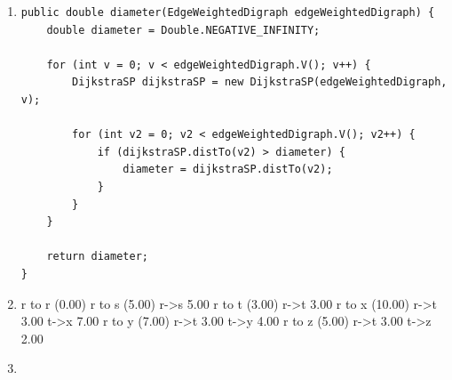 \documentclass[11pt,fleqn]{article}
\begin{document}
\begin{enumerate}
	\item 
\begin{Verbatim}
public double diameter(EdgeWeightedDigraph edgeWeightedDigraph) {
	double diameter = Double.NEGATIVE_INFINITY;

	for (int v = 0; v < edgeWeightedDigraph.V(); v++) {
		DijkstraSP dijkstraSP = new DijkstraSP(edgeWeightedDigraph, v);

		for (int v2 = 0; v2 < edgeWeightedDigraph.V(); v2++) {
			if (dijkstraSP.distTo(v2) > diameter) {
				diameter = dijkstraSP.distTo(v2);
			}
		}
	}

	return diameter;
}
\end{Verbatim}

	\item
r to r (0.00)  
r to s (5.00)  r->s  5.00   
r to t (3.00)  r->t  3.00   
r to x (10.00)  r->t  3.00   t->x  7.00   
r to y (7.00)  r->t  3.00   t->y  4.00   
r to z (5.00)  r->t  3.00   t->z  2.00

	\item

\end{enumerate}
\end{document}

